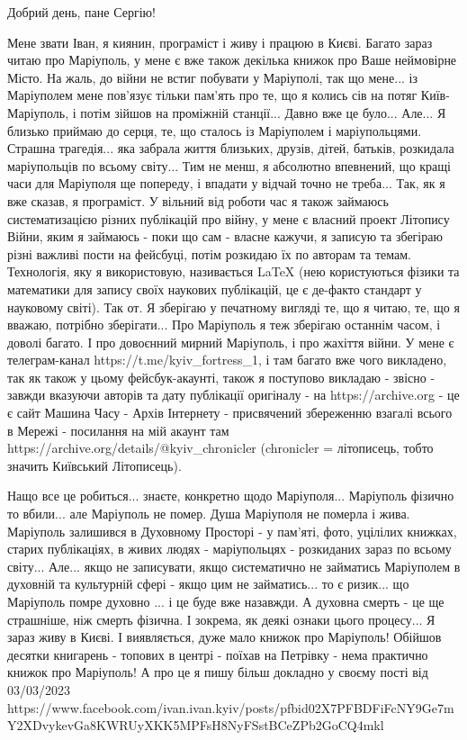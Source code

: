  
 
 
 
 

Добрий день, пане Сергію!

Мене звати Іван, я киянин, програміст і живу і працюю в Києві. Багато зараз
читаю про Маріуполь, у мене є вже також декілька книжок про Ваше неймовірне
Місто. На жаль, до війни не встиг побувати у Маріуполі, так що мене...  із
Маріуполем мене пов'язує тільки пам'ять про те, що я колись сів на потяг
Київ-Маріуполь, і потім зійшов на проміжній станції... Давно вже це було...
Але... Я близько приймаю до серця, те, що сталось із Маріуполем і
маріупольцями. Страшна трагедія... яка забрала життя близьких, друзів, дітей,
батьків, розкидала маріупольців по всьому світу...  Тим не менш, я абсолютно
впевнений, що кращі часи для Маріуполя ще попереду, і впадати у відчай точно не
треба...  Так, як я вже сказав, я програміст. У вільний від роботи час я також
займаюсь систематизацією різних публікацій про війну, у мене є власний проект
Літопису Війни, яким я займаюсь - поки що сам - власне кажучи, я записую та
збегіраю різні важливі пости на фейсбуці, потім розкидаю їх по авторам та
темам. Технологія, яку я використовую, називається LaTeX (нею користуються
фізики та математики для запису своїх наукових публікацій, це є де-факто
стандарт у науковому світі). Так от.  Я зберігаю у печатному вигляді те, що я
читаю, те, що я вважаю, потрібно зберігати...  Про Маріуполь я теж зберігаю
останнім часом, і доволі багато. І про довоєнний мирний Маріуполь, і про
жахіття війни. У мене є телеграм-канал https://t.me/kyiv_fortress_1, і там
багато вже чого викладено, так як також у цьому фейсбук-акаунті, також я
поступово викладаю - звісно - завжди вказуючи авторів та дату публікації
оригіналу - на https://archive.org - це є сайт Машина Часу - Архів Інтернету -
присвячений збереженню взагалі всього в Мережі - посилання на мій акаунт там
https://archive.org/details/@kyiv_chronicler (chronicler = літописець, тобто
значить Київський Літописець).

Нащо все це робиться... знаєте, конкретно щодо Маріуполя... Маріуполь фізично
то вбили...  але Маріуполь не помер. Душа Маріуполя не померла і жива.
Маріуполь залишився в Духовному Просторі - у пам'яті, фото, уцілілих книжках,
старих публікаціях, в живих людях - маріупольцях - розкиданих зараз по всьому
світу...  Але... якщо не записувати, якщо систематично не займатись Маріуполем
в духовній та культурній сфері - якщо цим не займатись... то є ризик... що
Маріуполь помре духовно ...  і це буде вже назавжди. А духовна смерть - це ще
страшніше, ніж смерть фізична. І зокрема, як деякі ознаки цього процесу... Я
зараз живу в Києві. І виявляється, дуже мало книжок про Маріуполь!  Обійшов
десятки книгарень - топових в центрі - поїхав на Петрівку - нема практично
книжок про Маріуполь!  А про це я пишу більш докладно у своєму пості від
03/03/2023
https://www.facebook.com/ivan.ivan.kyiv/posts/pfbid02X7PFBDFiFcNY9Ge7mY2XDvykevGa8KWRUyXKK5MPFsH8NyFSstBCeZPb2GoCQ4mkl

